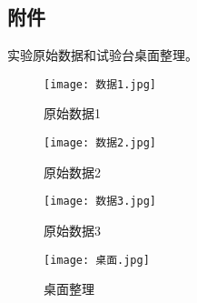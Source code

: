 \documentclass[dvipsnames, svgnames,a4paper,11pt]{article}
\begin{document}
	
	
	\subsection{附件}
	实验原始数据和试验台桌面整理。
	\begin{figure}[H]
		\centering
		\begin{minipage}[b]{0.35\linewidth}
			\centering
			\texttt{[image: 数据1.jpg]}
			\caption{原始数据1}
		\end{minipage}
		\hfill
		\begin{minipage}[b]{0.35\linewidth}
			\centering
			\texttt{[image: 数据2.jpg]}
			\caption{原始数据2}
		\end{minipage}
	\end{figure}
	
	\begin{figure}[H]
		\centering
		\begin{minipage}[b]{0.35\linewidth}
			\centering
			\texttt{[image: 数据3.jpg]}
			\caption{原始数据3}
		\end{minipage}
		\hfill
		\begin{minipage}[b]{0.35\linewidth}
			\centering
			\texttt{[image: 桌面.jpg]}
			\caption{桌面整理}
		\end{minipage}
	\end{figure}

	
	
	
	
\end{document}
